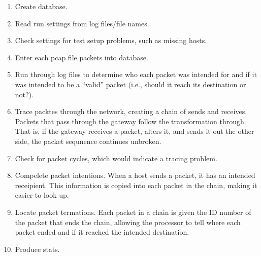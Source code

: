 \begin{enumerate}
\item Create database.
\item Read run settings from log files/file names.
\item Check settings for test setup problems, such as missing hosts.
\item Enter each pcap file packets into database.
\item Run through log files to determine who each packet was intended for and if it was intended to be a ``valid'' packet (i.e., should it reach its destination or not?).
\item Trace packtes through the network, creating a chain of sends and receives. Packets that pass through the gateway follow the transformation through. That is, if the gateway receives a packet, alters it, and sends it out the other side, the packet sequnence continues unbroken.
\item Check for packet cycles, which would indicate a tracing problem.
\item Compelete packet intentions. When a host sends a packet, it has an intended receipient. This information is copied into each packet in the chain, making it easier to look up.
\item Locate packet termations. Each packet in a chain is given the ID number of the packet that ends the chain, allowing the processor to tell where each packet ended and if it reached the intended destination.
\item Produce stats.
\end{enumerate}


